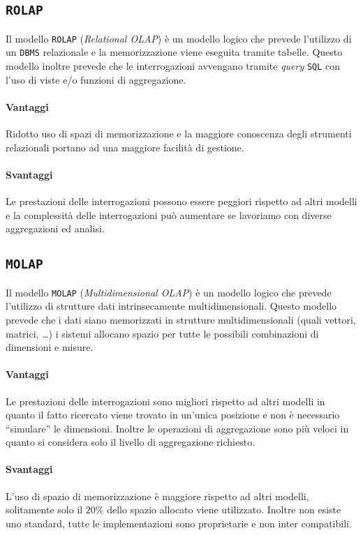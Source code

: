     \subsection{\texttt{ROLAP}}
        Il modello \texttt{ROLAP} (\textit{Relational OLAP}) è un modello logico che prevede l'utilizzo di un \texttt{DBMS} relazionale e la memorizzazione viene eseguita tramite tabelle. Questo modello inoltre prevede che le interrogazioni avvengano tramite \textit{query} \texttt{SQL} con l'uso di viste e/o funzioni di aggregazione.
        \paragraph{Vantaggi} Ridotto uso di spazi di memorizzazione e la maggiore conoscenza degli strumenti relazionali portano ad una maggiore facilità di gestione.
        \paragraph{Svantaggi} Le prestazioni delle interrogazioni possono essere peggiori rispetto ad altri modelli e la complessità delle interrogazioni può aumentare se lavoriamo con diverse aggregazioni ed analisi.
    \subsection{\texttt{MOLAP}}
        Il modello \texttt{MOLAP} (\textit{Multidimensional OLAP}) è un modello logico che prevede l'utilizzo di strutture dati intrinsecamente multidimensionali. Questo modello prevede che i dati siano memorizzati in strutture multidimensionali (quali vettori, matrici, \dots) i sistemi allocano spazio per tutte le possibili combinazioni di dimensioni e misure.
        \paragraph{Vantaggi} Le prestazioni delle interrogazioni sono migliori rispetto ad altri modelli in quanto il fatto ricercato viene trovato in un'unica posizione e non è necessario ``simulare'' le dimensioni. Inoltre le operazioni di aggregazione sono più veloci in quanto si considera solo il livello di aggregazione richiesto.
        \paragraph{Svantaggi} L'uso di spazio di memorizzazione è maggiore rispetto ad altri modelli, solitamente solo il $20\%$ dello spazio allocato viene utilizzato. Inoltre non esiste uno standard, tutte le implementazioni sono proprietarie e non inter compatibili.
